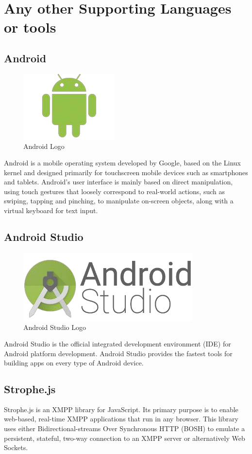 \section{Any other Supporting Languages or tools}
\subsection{Android}
\begin{figure}[ht]
\centering
\includegraphics[scale=0.5]{input/images/android.png}
\caption{Android Logo}
\end{figure}
Android is a mobile operating system developed by Google, based on the Linux kernel and designed
primarily for touchscreen mobile devices such as smartphones and tablets. Android's user interface is
mainly based on direct manipulation, using touch gestures that loosely correspond to real-world actions,
such as swiping, tapping and pinching, to manipulate on-screen objects, along with a virtual keyboard for
text input. 
\subsection{Android Studio}
\begin{figure}[ht]
\centering
\includegraphics[scale=0.5]{input/images/as.png}
\caption{Android Studio Logo}
\end{figure}
Android Studio is the official integrated development environment (IDE) for Android platform
development. Android Studio provides the fastest tools for building apps on every type of Android device.
\subsection{Strophe.js}
Strophe.js is an XMPP library for JavaScript. Its primary purpose is to enable web-based, real-time XMPP
applications that run in any browser. This library uses either Bidirectional-streams Over Synchronous
HTTP (BOSH) to emulate a persistent, stateful, two-way connection to an XMPP server or alternatively
Web Sockets.
